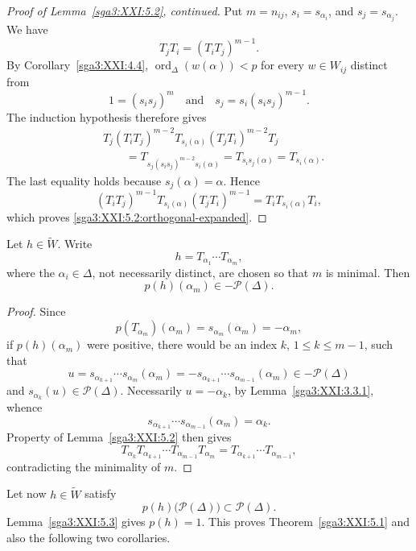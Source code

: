 \begin{proof}[Proof of Lemma~\ref{sga3:XXI:5.2}, continued]
Put \(m=n_{ij}\), \(s_i=s_{\alpha_i}\), and
\(s_j=s_{\alpha_j}\). We have
\[
 T_jT_i=(T_iT_j)^{m-1}.
\]
By Corollary~\ref{sga3:XXI:4.4},
\(\operatorname{ord}_\Delta(w(\alpha))<p\) for every
\(w\in W_{ij}\) distinct from
\[
 1=(s_is_j)^m
 \quad\text{and}\quad
 s_j=s_i(s_is_j)^{m-1}.
\]
The induction hypothesis therefore gives
\[
\begin{split}
 &T_j(T_iT_j)^{m-2}T_{s_i(\alpha)}
       (T_jT_i)^{m-2}T_j\\
 &\qquad
 =T_{s_j(s_is_j)^{m-2}s_i(\alpha)}
 =T_{s_is_j(\alpha)}
 =T_{s_i(\alpha)}.
\end{split}
\]
The last equality holds because \(s_j(\alpha)=\alpha\). Hence
\[
 (T_iT_j)^{m-1}T_{s_i(\alpha)}(T_jT_i)^{m-1}
 =T_iT_{s_i(\alpha)}T_i,
\]
which proves \eqref{sga3:XXI:5.2:orthogonal-expanded}.
\end{proof}

\begin{lemma}\label{sga3:XXI:5.3}
Let \(h\in\widetilde W\). Write
\[
 h=T_{\alpha_1}\cdots T_{\alpha_m},
\]
where the \(\alpha_i\in\Delta\), not necessarily distinct, are chosen
so that \(m\) is minimal. Then
\[
 p(h)(\alpha_m)\in-\mathscr{P}(\Delta).
\]
\end{lemma}

\begin{proof}
Since
\[
 p(T_{\alpha_m})(\alpha_m)
 =s_{\alpha_m}(\alpha_m)=-\alpha_m,
\]
if \(p(h)(\alpha_m)\) were positive, there would be an index
\(k\), \(1\le k\le m-1\), such that
\[
 u=s_{\alpha_{k+1}}\cdots s_{\alpha_m}(\alpha_m)
 =-s_{\alpha_{k+1}}\cdots s_{\alpha_{m-1}}(\alpha_m)
 \in-\mathscr{P}(\Delta)
\]
and \(s_{\alpha_k}(u)\in\mathscr{P}(\Delta)\). Necessarily
\(u=-\alpha_k\), by Lemma~\ref{sga3:XXI:3.3.1}, whence
\[
 s_{\alpha_{k+1}}\cdots s_{\alpha_{m-1}}(\alpha_m)=\alpha_k.
\]
Property  of Lemma~\ref{sga3:XXI:5.2} then gives
\[
 T_{\alpha_k}T_{\alpha_{k+1}}\cdots
 T_{\alpha_{m-1}}T_{\alpha_m}
 =
 T_{\alpha_{k+1}}\cdots T_{\alpha_{m-1}},
\]
contradicting the minimality of \(m\).
\end{proof}

Let now \(h\in\widetilde W\) satisfy
\[
 p(h)\bigl(\mathscr{P}(\Delta)\bigr)
 \subset\mathscr{P}(\Delta).
\]
Lemma~\ref{sga3:XXI:5.3} gives \(p(h)=1\). This proves
Theorem~\ref{sga3:XXI:5.1} and also the following two corollaries.

